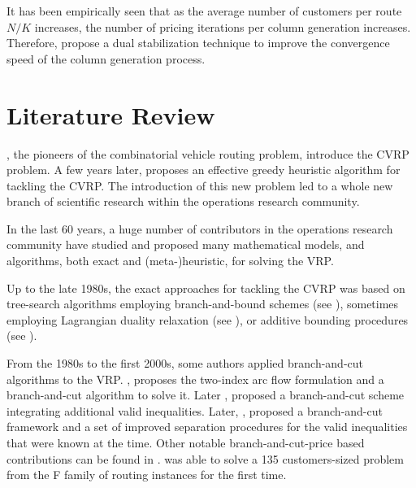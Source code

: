 It has been empirically seen that
as the average number of customers per route $N / K$ increases,
the number of pricing iterations per column generation increases.
Therefore, \textcite{dumerle1999, pessoa2013} propose a dual stabilization
technique to improve the convergence speed of the column generation process.







\section{Literature Review}
\label{sec:intro-literature-review}

\textcite{dantzig1959},
the pioneers of the combinatorial vehicle routing problem,
introduce the CVRP problem.
A few years later, \textcite{clarke1964} proposes
an effective greedy heuristic algorithm for tackling the CVRP.
The introduction of this new problem led to a whole new branch
of scientific research within the operations research community.

In the last 60 years, a huge number of contributors in
the operations research community have studied and proposed many
mathematical models, and algorithms, both exact and (meta-)heuristic,
for solving the VRP.

Up to the late 1980s, the exact approaches for tackling the CVRP was
based on tree-search algorithms employing branch-and-bound schemes
(see \textcite{pierce1969, christofides1969a, christofides1981, laporte1986}),
sometimes employing Lagrangian duality relaxation (see \textcite{fisher1994a, miller1995}),
or additive bounding procedures (see \textcite{fischetti1994a, hadjiconstantinou1995}).

From the 1980s to the first 2000s, some authors applied branch-and-cut
algorithms to the VRP.
\textcite{laporte1985}, proposes the two-index arc flow formulation
and a branch-and-cut algorithm to solve it.
Later \textcite{augerat1995a}, proposed a branch-and-cut scheme
integrating additional valid inequalities.
Later, \textcite{lysgaard2004},
proposed a branch-and-cut framework and
a set of improved separation procedures for
the valid inequalities that were known at the time.
Other notable branch-and-cut-price based contributions
can be found in \textcite{araqueg1994, augerat1995, achuthan1996, blasum2000, ralphs2003, achuthan2003, baldacci2004}.
\citeauthor{baldacci2004} was able to solve a
135 customers-sized problem from the F family of routing instances \textcite{fisher1994}
for the first time.

